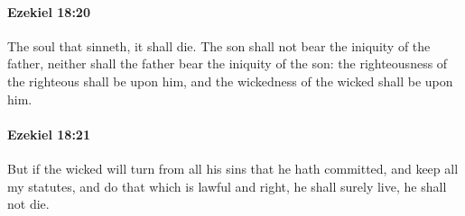 		\paragraph{Ezekiel 18:20} %
			\label{EZEKIEL-18-20}

			The soul that sinneth, it shall die. The son shall not bear the iniquity of the father, neither shall the father bear the iniquity of the son: the righteousness of the righteous shall be upon him, and the wickedness of the wicked shall be upon him.


		\paragraph{Ezekiel 18:21} %
			\label{EZEKIEL-18-21}

			But if the wicked will turn from all his sins that he hath committed, and keep all my statutes, and do that which is lawful and right, he shall surely live, he shall not die.

